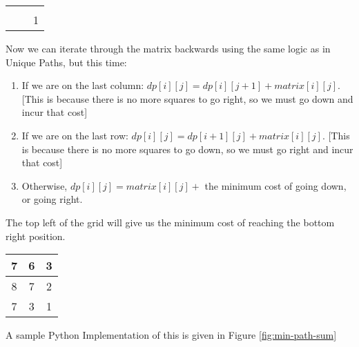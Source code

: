\begin{table}[H]
    \centering
    \begin{tabular}{|c|c|c|}
        \hline
         &  &  \\
        \hline
         &  &  \\
        \hline
         &  & 1 \\
        \hline
    \end{tabular}
\end{table}
Now we can iterate through the matrix backwards using the same logic as in Unique Paths, but this time:


\begin{enumerate}
    \item If we are on the last column: $dp[i][j] = dp[i][j+1] + matrix[i][j]$.
    [This is because there is no more squares to go right, so we must go down and incur that cost]

    \item If we are on the last row: $dp[i][j] = dp[i+1][j] + matrix[i][j]$.
    [This is because there is no more squares to go down, so we must go right and incur that cost]

    \item Otherwise, $dp[i][j] = matrix[i][j] +$ the minimum cost of going down, or going right.

\end{enumerate}

The top left of the grid will give us the minimum cost of reaching the bottom right position.

\begin{table}[H]
    \centering
    \begin{tabular}{|c|c|c|}
        \hline
        7 & 6 & 3 \\
        \hline
        8 & 7 & 2 \\
        \hline
        7 & 3 & 1 \\
        \hline
    \end{tabular}
\end{table}

A sample Python Implementation of this is given in Figure \ref{fig:min-path-sum}

